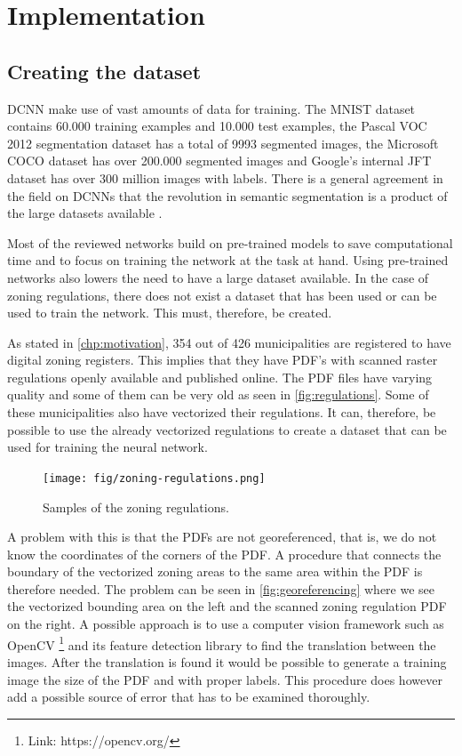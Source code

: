 \chapter{Implementation}

\section{Creating the dataset}\label{chp:dataset}
DCNN make use of vast amounts of data for training. The MNIST dataset contains 60.000 training examples and 10.000 test examples, the Pascal VOC 2012 segmentation dataset \cite{PASCALVOC2012} has a total of 9993 segmented images, the Microsoft COCO dataset \cite{Lin2014} has over 200.000 segmented images and Google's internal JFT dataset \cite{Hinton2015} has over 300 million images with labels. There is a general agreement in the field on DCNNs that the revolution in semantic segmentation is a product of the large datasets available \cite{Sun2017}.

Most of the reviewed networks build on pre-trained models to save computational time and to focus on training the network at the task at hand. Using pre-trained networks also lowers the need to have a large dataset available. In the case of zoning regulations, there does not exist a dataset that has been used or can be used to train the network. This must, therefore, be created.

As stated in \autoref{chp:motivation}, 354 out of 426 municipalities are registered to have digital zoning registers. This implies that they have PDF's with scanned raster regulations openly available and published online. The PDF files have varying quality and some of them can be very old as seen in \autoref{fig:regulations}. Some of these municipalities also have vectorized their regulations. It can, therefore, be possible to use the already vectorized regulations to create a dataset that can be used for training the neural network.

\begin{figure}[H]
	\centering
	\texttt{[image: fig/zoning-regulations.png]}
	\caption{Samples of the zoning regulations.}
	\label{fig:regulations}
\end{figure}

A problem with this is that the PDFs are not georeferenced, that is, we do not know the coordinates of the corners of the PDF. A procedure that connects the boundary of the vectorized zoning areas to the same area within the PDF is therefore needed. The problem can be seen in \autoref{fig:georeferencing} where we see the vectorized bounding area on the left and the scanned zoning regulation PDF on the right. A possible approach is to use a computer vision framework such as OpenCV \footnote{Link: https://opencv.org/} and its feature detection library to find the translation between the images. After the translation is found it would be possible to generate a training image the size of the PDF and with proper labels. This procedure does however add a possible source of error that has to be examined thoroughly.

